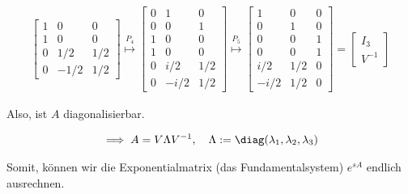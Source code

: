 \begin{solution}
\begin{multline*}
\begin{bmatrix}
        1 &  0 & 0 \\
        \hline
        1 &  0   & 0 \\
        0 &  1/2 & 1/2 \\
        0 & -1/2 & 1/2
    \end{bmatrix}
    \stackrel{P_4}{\mapsto}
    \begin{bmatrix}
        0 & 1 & 0 \\
        0 & 0 & 1 \\
        1 & 0 & 0 \\
        \hline
        1 &  0   & 0 \\
        0 &  i/2 & 1/2 \\
        0 & -i/2 & 1/2
    \end{bmatrix}
    \stackrel{P_5}{\mapsto}
    \begin{bmatrix}
        1 & 0 & 0 \\
        0 & 1 & 0 \\
        0 & 0 & 1 \\
        \hline
         0   & 0   & 1 \\
         i/2 & 1/2 & 0 \\
        -i/2 & 1/2 & 0
    \end{bmatrix}
    =
    \begin{bmatrix}
        I_3 \\
        \hline
        V^{-1}
    \end{bmatrix}
\end{multline*}

Also, ist $A$ diagonalisierbar.

\begin{align*}
    \implies
    A = V \Lambda V^{-1},
    \quad
    \Lambda := \diag(\lambda_1, \lambda_2, \lambda_3)
\end{align*}

Somit, können wir die Exponentialmatrix (das Fundamentalsystem) $e^{sA}$ endlich ausrechnen.


\end{solution}

